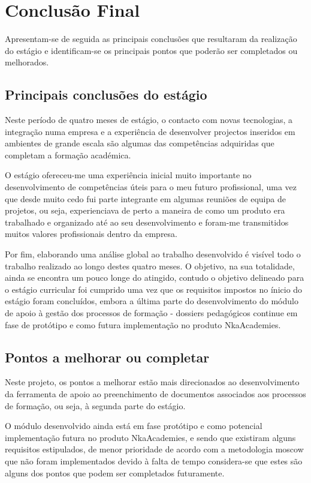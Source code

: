 \chapter{Conclusão Final}
\label{conc}

Apresentam-se de seguida as principais conclusões que resultaram da realização do estágio e identificam-se os principais pontos que poderão ser completados ou melhorados.

\section{Principais conclusões do estágio}

Neste período de quatro meses de estágio, o contacto com novas tecnologias, a integração numa empresa e a experiência de desenvolver projectos inseridos em ambientes de grande escala são algumas das competências adquiridas que completam a formação académica.

O estágio ofereceu-me uma experiência inicial muito importante no desenvolvimento de competências úteis para o meu futuro profissional, uma vez que desde muito cedo fui parte integrante em algumas reuniões de equipa de projetos, ou seja, experienciava de perto a maneira de como um produto era trabalhado e organizado até ao seu desenvolvimento e foram-me transmitidos muitos valores profissionais dentro da empresa.

Por fim, elaborando uma análise global ao trabalho desenvolvido é visível todo o trabalho realizado ao longo destes quatro meses. O objetivo, na sua totalidade, ainda se encontra um pouco longe do atingido, contudo o objetivo delineado para o estágio curricular foi cumprido uma vez que os requisitos impostos no ínicio do estágio foram concluídos, embora a última parte do desenvolvimento do módulo de apoio à gestão dos processos de formação - dossiers pedagógicos continue em fase de protótipo e como futura implementação no produto NkaAcademies.


\section{Pontos a melhorar ou completar}

Neste projeto, os pontos a melhorar estão mais direcionados ao desenvolvimento da ferramenta de apoio ao preenchimento de documentos associados aos processos de formação, ou seja, à segunda parte do estágio.

O módulo desenvolvido ainda está em fase protótipo e como potencial implementação futura no produto NkaAcademies, e sendo que existiram alguns requisitos estipulados, de menor prioridade de acordo com a metodologia \acrshort{moscow} que não foram implementados devido à falta de tempo considera-se que estes são alguns dos pontos que podem ser completados futuramente.
